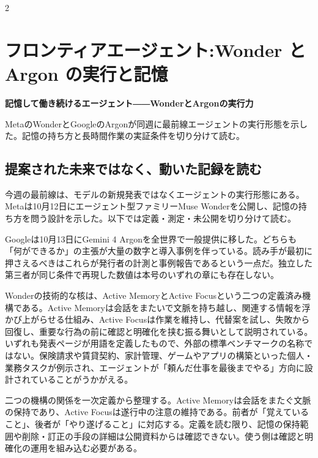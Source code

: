 \documentclass[lualatex,a4paper,10pt]{jlreq}
\begin{document}
\surveycover
\clearpage
\begin{multicols}{2}

\section{フロンティアエージェント:Wonder と Argon の実行と記憶}
\label{sec:P1}

{\Large\bfseries 記憶して働き続けるエージェント――WonderとArgonの実行力\par}
\smallskip
{\color{SurveyMuted}MetaのWonderとGoogleのArgonが同週に最前線エージェントの実行形態を示した。記憶の持ち方と長時間作業の実証条件を切り分けて読む。\par}
\bigskip

\subsection*{提案された未来ではなく、動いた記録を読む}

今週の最前線は、モデルの新規発表ではなくエージェントの実行形態にある。Metaは10月12日にエージェント型ファミリーMuse Wonderを公開し、記憶の持ち方を問う設計を示した。以下では定義・測定・未公開を切り分けて読む。
\cite{B01,B62,B63,B02,B64,B03}


Googleは10月13日にGemini 4 Argonを全世界で一般提供に移した。どちらも「何ができるか」の主張が大量の数字と導入事例を伴っている。読み手が最初に押さえるべきはこれらが発行者の計測と事例報告であるという一点だ。独立した第三者が同じ条件で再現した数値は本号のいずれの章にも存在しない。
\cite{B05,B65,B08,B04,B07,B06}


Wonderの技術的な核は、Active MemoryとActive Focusという二つの定義済み機構である。Active Memoryは会話をまたいで文脈を持ち越し、関連する情報を浮かび上がらせる仕組み、Active Focusは作業を維持し、代替案を試し、失敗から回復し、重要な行為の前に確認と明確化を挟む振る舞いとして説明されている。いずれも発表ページが用語を定義したもので、外部の標準ベンチマークの名称ではない。保険請求や賃貸契約、家計管理、ゲームやアプリの構築といった個人・業務タスクが例示され、エージェントが「頼んだ仕事を最後までやる」方向に設計されていることがうかがえる。
\cite{B01,B62,B63,B02,B64,B03}


二つの機構の関係を一次定義から整理する。Active Memoryは会話をまたぐ文脈の保持であり、Active Focusは遂行中の注意の維持である。前者が「覚えていること」、後者が「やり遂げること」に対応する。定義を読む限り、記憶の保持範囲や削除・訂正の手段の詳細は公開資料からは確認できない。使う側は確認と明確化の運用を組み込む必要がある。
\cite{B01,B62,B63,B02,B64,B03}



\end{multicols}
\end{document}
